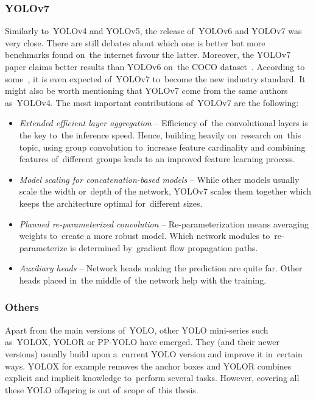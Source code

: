 \subsubsection{YOLOv7}
Similarly to~YOLOv4 and YOLOv5, the release of~YOLOv6 and YOLOv7 was very close. There are still debates about which one is better but more benchmarks found on~the internet favour the latter. Moreover, the YOLOv7 paper claims better results than YOLOv6 on~the COCO dataset~\cite{yolov7}. According to some~\cite{yolov7-web}, it is even expected of~YOLOv7 to~become the new industry standard. It might also be worth mentioning that YOLOv7 come from the same authors as~YOLOv4. The most important contributions of~YOLOv7 are the following:~\cite{yolov7}

\begin{itemize}[topsep=0pt,itemsep=-1.5pt,partopsep=6pt]
    \item \emph{Extended efficient layer aggregation} -- Efficiency of~the convolutional layers is the key to~the inference speed. Hence, building heavily on~research on~this topic, using group convolution to~increase feature cardinality and combining features of~different groups leads to an improved feature learning process.
    \item \emph{Model scaling for concatenation-based models} -- While other models usually scale the width or~depth of the network, YOLOv7 scales them together which keeps the architecture optimal for~different sizes.
    \item \emph{Planned re-parameterized convolution} -- Re-parameterization means averaging weights to~create a more robust model. Which network modules to~re-parameterize is determined by~gradient flow propagation paths.
    \item \emph{Auxiliary heads} -- Network heads making the prediction are quite far. Other heads placed in~the middle of~the network help with the training.
\end{itemize}

\subsubsection{Others}
Apart from the main versions of~YOLO, other YOLO mini-series such as~YOLOX, YOLOR or PP-YOLO have emerged. They (and their newer versions) usually build upon a~current YOLO version and improve it in~certain ways. YOLOX for example removes the anchor boxes and YOLOR combines explicit and implicit knowledge to~perform several tasks. However, covering all these YOLO offspring is out of~scope of~this thesis.

